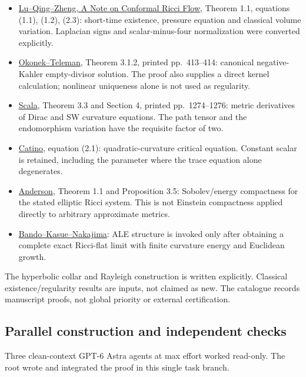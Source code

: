 \documentclass[
  10pt,
]{article}
\providecommand{\tightlist}{%
  \setlength{\itemsep}{0pt}\setlength{\parskip}{0pt}}
\begin{document}
\begin{itemize}
\tightlist
\item
  \href{https://arxiv.org/pdf/1109.5377}{Lu--Qing--Zheng, A Note on
  Conformal Ricci Flow}, Theorem 1.1, equations (1.1), (1.2), (2.3):
  short-time existence, pressure equation and classical volume
  variation. Laplacian signs and scalar-minus-four normalization were
  converted explicitly.
\item
  \href{https://library.slmath.org/books/Book37/files/okonek.pdf}{Okonek--Teleman},
  Theorem 3.1.2, printed pp.~413--414: canonical negative-Kahler
  empty-divisor solution. The proof also supplies a direct kernel
  calculation; nonlinear uniqueness alone is not used as regularity.
\item
  \href{https://www.numdam.org/item/10.5802/aif.2640.pdf}{Scala},
  Theorem 3.3 and Section 4, printed pp.~1274--1276: metric derivatives
  of Dirac and SW curvature equations. The path tensor and the
  endomorphism variation have the requisite factor of two.
\item
  \href{https://arxiv.org/pdf/1404.0569}{Catino}, equation (2.1):
  quadratic-curvature critical equation. Constant scalar is retained,
  including the parameter where the trace equation alone degenerates.
\item
  \href{https://arxiv.org/pdf/math/0312111}{Anderson}, Theorem 1.1 and
  Proposition 3.5: Sobolev/energy compactness for the stated elliptic
  Ricci system. This is not Einstein compactness applied directly to
  arbitrary approximate metrics.
\item
  \href{https://doi.org/10.1007/BF01389045}{Bando--Kasue--Nakajima}: ALE
  structure is invoked only after obtaining a complete exact Ricci-flat
  limit with finite curvature energy and Euclidean growth.
\end{itemize}

The hyperbolic collar and Rayleigh construction is written explicitly.
Classical existence/regularity results are inputs, not claimed as new.
The catalogue records manuscript proofs, not global priority or external
certification.

\hypertarget{parallel-construction-and-independent-checks}{%
\subsection{Parallel construction and independent
checks}\label{parallel-construction-and-independent-checks}}

Three clean-context GPT-6 Astra agents at max effort worked read-only.
The root wrote and integrated the proof in this single task branch.
\end{document}
